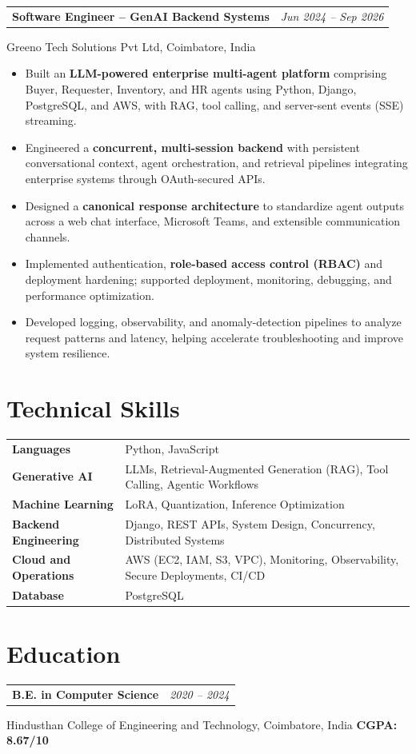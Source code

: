 \documentclass[11pt,a4paper]{article}
\makeatletter
\newcommand{\entryheader}[2]{%
  \begin{tabularx}{\textwidth}{@{}X r@{}}
    \textbf{#1} & \textit{#2}
  \end{tabularx}%
}
\makeatother
\begin{document}
\vspace{8pt}

\entryheader
  {Software Engineer -- GenAI Backend Systems}
  {Jun 2024 -- Sep 2026}
Greeno Tech Solutions Pvt Ltd, Coimbatore, India

\begin{itemize}
  \item Built an \textbf{LLM-powered enterprise multi-agent platform}
  comprising Buyer, Requester, Inventory, and HR agents using
  Python, Django, PostgreSQL, and AWS, with RAG, tool calling,
  and server-sent events (SSE) streaming.

  \item Engineered a \textbf{concurrent, multi-session backend}
  with persistent conversational context, agent orchestration,
  and retrieval pipelines integrating enterprise systems through
  OAuth-secured APIs.

  \item Designed a \textbf{canonical response architecture} to
  standardize agent outputs across a web chat interface,
  Microsoft Teams, and extensible communication channels.

  \item Implemented authentication, \textbf{role-based access
  control (RBAC)} and deployment hardening; supported deployment,
  monitoring, debugging, and performance optimization.

  \item Developed logging, observability, and anomaly-detection
  pipelines to analyze request patterns and latency, helping
  accelerate troubleshooting and improve system resilience.
\end{itemize}

\section*{Technical Skills}

\begin{tabularx}{\textwidth}{@{}>{\bfseries}l X@{}}
Languages &
Python, JavaScript \\[2pt]

Generative AI &
LLMs, Retrieval-Augmented Generation (RAG), Tool Calling,
Agentic Workflows \\[2pt]

Machine Learning &
LoRA, Quantization, Inference Optimization \\[2pt]

Backend Engineering &
Django, REST APIs, System Design, Concurrency,
Distributed Systems \\[2pt]

Cloud and Operations &
AWS (EC2, IAM, S3, VPC), Monitoring, Observability,
Secure Deployments, CI/CD \\[2pt]

Database &
PostgreSQL
\end{tabularx}

\section*{Education}

\entryheader
  {B.E. in Computer Science}
  {2020 -- 2024}

Hindusthan College of Engineering and Technology,
Coimbatore, India
\hfill
\textbf{CGPA: 8.67/10}
\end{document}
